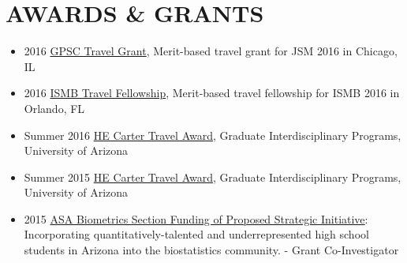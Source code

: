 \documentclass[paper=a4,fontsize=11pt]{scrartcl} %
\newcommand{\NewPart}[2]{\section*{\uppercase{#1} #2 }}
\begin{document}

\NewPart{Awards \& Grants}{}
\vspace{-7pt}
\begin{itemize}[noitemsep]
\item 2016 \href{http://gpsc.arizona.edu/travel-grants}{GPSC Travel Grant}, Merit-based travel grant for JSM 2016 in Chicago, IL
\item 2016 \href{https://www.iscb.org/ismb2016-submission/ismb2016-travel-fellowship-2}{ISMB Travel Fellowship}, Merit-based travel fellowship for ISMB 2016 in Orlando, FL
\item Summer 2016 \href{https://gidp.arizona.edu/carter-travel-award/award-recipients}{HE Carter Travel Award}, Graduate Interdisciplinary Programs, University of Arizona 
\item Summer 2015 \href{https://gidp.arizona.edu/carter-travel-award/award-recipients}{HE Carter Travel Award}, Graduate Interdisciplinary Programs, University of Arizona 
\item 2015 \href{http://stattrak.amstat.org/2014/03/01/grant-opportunity}{ASA Biometrics Section Funding of Proposed Strategic Initiative}:  Incorporating quantitatively-talented and underrepresented high school students in Arizona into the biostatistics community. - Grant Co-Investigator
\vspace{-7pt}
\end{itemize}
\end{document}
